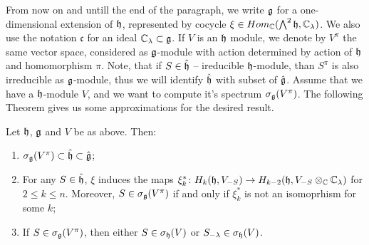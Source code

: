 From now on and untill the end of the paragraph, we write $\mathfrak{g}$ for a one-dimensional extension
of $\mathfrak{h}$, represented by cocycle $\xi \in Hom_{\mathbb{C}}(\bigwedge^2\mathfrak{h}, \mathbb{C}_\lambda)$. We also use
the notation $\mathfrak{c}$ for an ideal $\mathbb{C}_\lambda\subset \mathfrak{g}$. If $V$ is an $\mathfrak{h}$ module,
we denote by $V^\pi$ the same vector space, considered as $\mathfrak{g}$-module with action determined by
action of $\mathfrak{h}$ and homomorphism $\pi$. Note, that if $S \in \hat{\mathfrak{h}}$ -- ireducible
$\mathfrak{h}$-module, than $S^\pi$ is also irreducible as $\mathfrak{g}$-module, thus we will identify
$\hat{\mathfrak{h}}$ with subset of $\hat{\mathfrak{g}}$. Assume that we have a $\mathfrak{h}$-module $V$, and we want to
compute it's spectrum $\sigma_{\mathfrak{g}} (V^\pi)$. The following Theorem gives us some approximations
for the desired result.
\begin{theorem} \label{t:1ext}
    Let $\mathfrak{h}$, $\mathfrak{g}$ and $V$ be as above. Then:
    \begin{enumerate}
        \item $\sigma_{\mathfrak{g}}(V^\pi) \subset \hat{\mathfrak{h}} \subset \hat{\mathfrak{g}}$;

        \item For any $S \in \hat{\mathfrak{h}}$, $\xi$ induces the maps $\xi_k^* \colon H_k(\mathfrak{h}, V_{-S})
            \to H_{k - 2}(\mathfrak{h},  V_{-S}\otimes_{\mathbb{C}} \mathbb{C}_\lambda)$ for $2 \leq k \leq n$. Moreover, $S \in
            \sigma_{\mathfrak{g}}(V^\pi)$ if and only if $\xi^*_k$ is not an isomoprhism for some $k$;

        \item If $S\in \sigma_{\mathfrak{g}}(V^\pi)$, then either $S \in \sigma_{\mathfrak{h}}(V)$ or
            $S_{-\lambda}\in \sigma_{\mathfrak{h}}(V)$.
    \end{enumerate}
\end{theorem}
